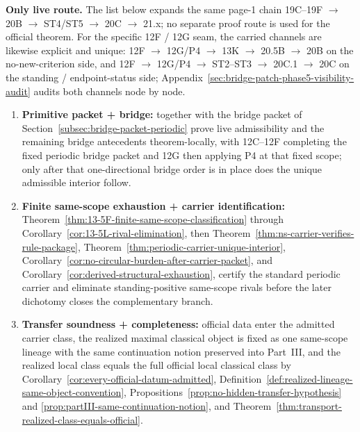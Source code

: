 \begin{tcolorbox}[breakable, title={Compressed proof spine for the official theorem}, colback=blue!2!white, colframe=blue!55!black, boxsep=1pt, left=2pt, right=2pt, top=2pt, bottom=2pt]
\textbf{Only live route.} The list below expands the same page-1 chain 19C--19F $\to$ 20B $\to$ ST4/ST5 $\to$ 20C $\to$ 21.x; no separate proof route is used for the official theorem. For the specific 12F / 12G seam, the carried channels are likewise explicit and unique: 12F $\to$ 12G/P4 $\to$ 13K $\to$ 20.5B $\to$ 20B on the no-new-criterion side, and 12F $\to$ 12G/P4 $\to$ ST2--ST3 $\to$ 20C.1 $\to$ 20C on the standing / endpoint-status side; Appendix~\ref{sec:bridge-patch-phase5-visibility-audit} audits both channels node by node.

\begin{enumerate}[label=(\roman*), leftmargin=2.2em, itemsep=0.15em, topsep=0.15em]
\item \textbf{Primitive packet + bridge:} \StructuralPacketRef{} together with the bridge packet of Section~\ref{subsec:bridge-packet-periodic} prove live admissibility and the remaining bridge antecedents theorem-locally, with 12C--12F completing the fixed periodic bridge packet and 12G then applying P4 at that fixed scope; only after that one-directional bridge order is in place does the unique admissible interior follow.
\item \textbf{Finite same-scope exhaustion + carrier identification:} Theorem~\ref{thm:13-5F-finite-same-scope-classification} through Corollary~\ref{cor:13-5L-rival-elimination}, then Theorem~\ref{thm:ns-carrier-verifies-rule-package}, Theorem~\ref{thm:periodic-carrier-unique-interior}, Corollary~\ref{cor:no-circular-burden-after-carrier-packet}, and Corollary~\ref{cor:derived-structural-exhaustion}, certify the standard periodic carrier and eliminate standing-positive same-scope rivals before the later dichotomy closes the complementary branch.
\item \textbf{Transfer soundness + completeness:} official data enter the admitted carrier class, the realized maximal classical object is fixed as one same-scope lineage with the same continuation notion preserved into Part~III, and the realized local class equals the full official local classical class by Corollary~\ref{cor:every-official-datum-admitted}, Definition~\ref{def:realized-lineage-same-object-convention}, Propositions~\ref{prop:no-hidden-transfer-hypothesis} and \ref{prop:partIII-same-continuation-notion}, and Theorem~\ref{thm:transport-realized-class-equals-official}.

\end{enumerate}
\end{tcolorbox}

